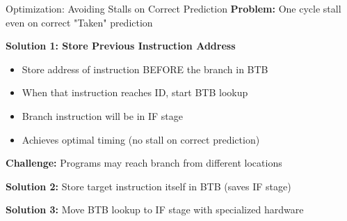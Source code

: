 \documentclass[aspectratio=169,12pt]{beamer}
\begin{document}
\begin{frame}{Optimization: Avoiding Stalls on Correct Prediction}
\textbf{Problem:} One cycle stall even on correct "Taken" prediction

\textbf{Solution 1: Store Previous Instruction Address}
\begin{itemize}
    \item Store address of instruction BEFORE the branch in BTB
    \item When that instruction reaches ID, start BTB lookup
    \item Branch instruction will be in IF stage
    \item Achieves optimal timing (no stall on correct prediction)
\end{itemize}

\textbf{Challenge:} Programs may reach branch from different locations

\vspace{0.1cm}
\begin{center}
\end{center}
\vspace{0.1cm}

\textbf{Solution 2:} Store target instruction itself in BTB (saves IF stage)

\textbf{Solution 3:} Move BTB lookup to IF stage with specialized hardware
\end{frame}
\end{document}
